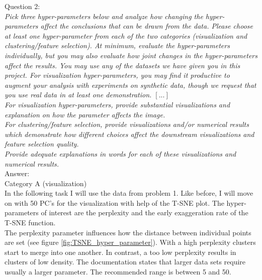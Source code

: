 Question 2:\\
\textsl{Pick three hyper-parameters below and analyze how changing the hyper-parameters affect the conclusions that can be drawn from the data. Please choose at least one hyper-parameter from each of the two categories (visualization and clustering/feature selection). At minimum, evaluate the hyper-parameters individually, but you may also evaluate how joint changes in the hyper-parameters affect the results. You may use any of the datasets we have given you in this project. For visualization hyper-parameters, you may find it productive to augment your analysis with experiments on synthetic data, though we request that you use real data in at least one demonstration. $[...]$ }\\
\textsl{For visualization hyper-parameters, provide substantial visualizations and explanation on how the parameter affects the image.}\\
\textsl{For clustering/feature selection, provide visualizations and/or numerical results which demonstrate how different choices affect the downstream visualizations and feature selection quality.}\\
\textsl{Provide adequate explanations in words for each of these visualizations and numerical results.}\\

Answer:\\
Category A (visualization)\\
In the following task I will use the data from problem 1. Like before, I will move on with 50 PC's for the visualization with help of the T-SNE plot. The hyper-parameters of interest are the perplexity and the early exaggeration rate of the T-SNE function.\\

The perplexity parameter influences how the distance between individual points are set (see figure \ref{fig:TSNE_hyper_parameter}). With a high perplexity clusters start to merge into one another. In contrast, a too low perplexity results in clusters of low density. The documentation states that larger data sets require usually a larger parameter. The recommended range is between 5 and 50.\\

